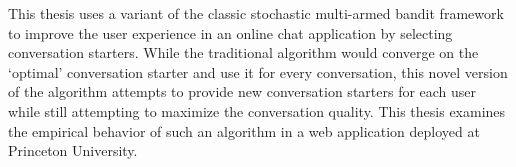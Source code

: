 This thesis uses a variant of the classic stochastic multi-armed bandit framework to improve the user experience in an online chat application by selecting conversation starters. While the traditional algorithm would converge on the `optimal' conversation starter and use it for every conversation, this novel version of the algorithm attempts to provide new conversation starters for each user while still attempting to maximize the conversation quality. This thesis examines the empirical behavior of such an algorithm in a web application deployed at Princeton University.
